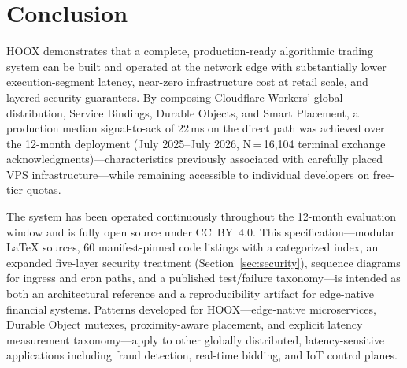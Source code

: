\section{Conclusion}
\label{sec:conclusion}

\textsc{HOOX} demonstrates that a complete, production-ready algorithmic trading system can be built and operated at the network edge with substantially lower execution-segment latency, near-zero infrastructure cost at retail scale, and layered security guarantees. By composing Cloudflare Workers' global distribution, Service Bindings, Durable Objects, and Smart Placement, a production median signal-to-ack of 22\,ms on the direct path was achieved over the 12-month deployment (July 2025--July 2026, N\,=\,16{,}104 terminal exchange acknowledgments)---characteristics previously associated with carefully placed VPS infrastructure---while remaining accessible to individual developers on free-tier quotas.

The system has been operated continuously throughout the 12-month evaluation window and is fully open source under CC~BY~4.0. This specification---modular \LaTeX{} sources, 60 manifest-pinned code listings with a categorized index, an expanded five-layer security treatment (Section~\ref{sec:security}), sequence diagrams for ingress and cron paths, and a published test/failure taxonomy---is intended as both an architectural reference and a reproducibility artifact for edge-native financial systems. Patterns developed for \textsc{HOOX}---edge-native microservices, Durable Object mutexes, proximity-aware placement, and explicit latency measurement taxonomy---apply to other globally distributed, latency-sensitive applications including fraud detection, real-time bidding, and IoT control planes.
